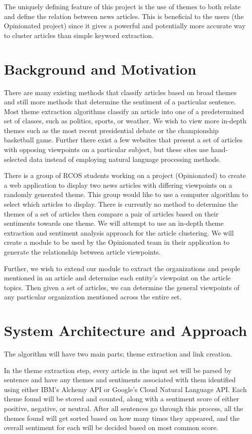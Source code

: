 \documentclass[12pt]{article}
\begin{document}
The uniquely defining feature of this project is the use of themes to both relate and define the relation between news articles.  This is beneficial to the users (the Opinionated project) since it gives a powerful and potentially more accurate way to cluster articles than simple keyword extraction.  

\section{Background and Motivation}
There are many existing methods that classify articles based on broad themes and still more methods that determine the sentiment of a particular sentence. Most theme extraction algorithms classify an article into one of a predetermined set of classes, such as politics, sports, or weather. We wish to view more in-depth themes such as the most recent presidential debate or the championship basketball game. Further there exist a few websites that present a set of articles with opposing viewpoints on a particular subject, but these sites use hand-selected data instead of employing natural language processing methods.

There is a group of RCOS students working on a project (Opinionated) to create a web application to display two news articles with differing viewpoints on a randomly generated theme. This group would like to use a computer algorithm to select which articles to display. There is currently no method to determine the themes of a set of articles then compare a pair of articles based on their sentiments towards one theme. We will attempt to use an in-depth theme extraction and sentiment analysis approach for the article clustering. We will create a module to be used by the Opinionated team in their application to generate the relationship between article viewpoints.

Further, we wish to extend our module to extract the organizations and people mentioned in an article and determine each entity's viewpoint on the article topics. Then given a set of articles, we can determine the general viewpoints of any particular organization mentioned across the entire set.

\section{System Architecture and Approach}
The algorithm will have two main parts; theme extraction and link creation.  

In the theme extraction step, every article in the input set will be parsed by sentence and have any themes and sentiments associated with them identified using either IBM's Alchemy API or Google's Cloud Natural Language API.  Each theme found will be stored and counted, along with a sentiment score of either positive, negative, or neutral.  After all sentences go through this process, all the themes found will get sorted based on how many times they appeared, and the overall sentiment for each will be decided based on most common score. 
\end{document}
